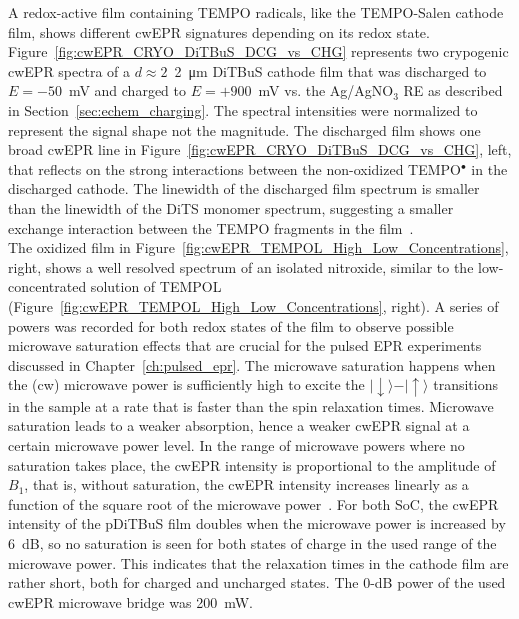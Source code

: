 A redox-active film containing TEMPO radicals, like the TEMPO-Salen cathode film, shows different cwEPR signatures depending on its redox state. Figure~\ref{fig:cwEPR_CRYO_DiTBuS_DCG_vs_CHG} represents two crypogenic cwEPR spectra of a $d\approx2$~\SI{2}{\micro\meter} DiTBuS cathode film that was discharged to $E=-50$~mV and charged to $E=+900$~mV vs. the Ag/AgNO$_3$ RE as described in Section~\ref{sec:echem_charging}. The spectral intensities were normalized to represent the signal shape not the magnitude. The discharged film shows one broad cwEPR line in Figure~\ref{fig:cwEPR_CRYO_DiTBuS_DCG_vs_CHG}, left, that reflects on the strong interactions between the non-oxidized TEMPO$^{\bullet}$ in the discharged cathode. The linewidth of the discharged film spectrum is smaller than the linewidth of the DiTS monomer spectrum, suggesting a smaller exchange interaction between the TEMPO fragments in the film~\cite{Vereshchagin2020}.\\
The oxidized film in Figure~\ref{fig:cwEPR_TEMPOL_High_Low_Concentrations}, right, shows a well resolved spectrum of an isolated nitroxide, similar to the low-concentrated solution of TEMPOL (Figure~\ref{fig:cwEPR_TEMPOL_High_Low_Concentrations}, right). A series of powers was recorded for both redox states of the film to observe possible microwave saturation effects that are crucial for the pulsed EPR experiments discussed in Chapter~\ref{ch:pulsed_epr}. The microwave saturation happens when the (cw) microwave power is sufficiently high to excite the $\vert{\downarrow}\rangle-\vert{\uparrow}\rangle$ transitions in the sample at a rate that is faster than the spin relaxation times. Microwave saturation leads to a weaker absorption, hence a weaker cwEPR signal at a certain microwave power level. In the range of microwave powers where no saturation takes place, the cwEPR intensity is proportional to the amplitude of $B_1$, that is, without saturation, the cwEPR intensity increases linearly as a function of the square root of the microwave power~\cite{Eaton_book}. For both SoC, the cwEPR intensity of the pDiTBuS film doubles when the microwave power is increased by 6~dB, so no saturation is seen for both states of charge in the used range of the microwave power. This indicates that the relaxation times in the cathode film are rather short, both for charged and uncharged states. The 0-dB power of the used cwEPR microwave bridge was 200~mW.\\

